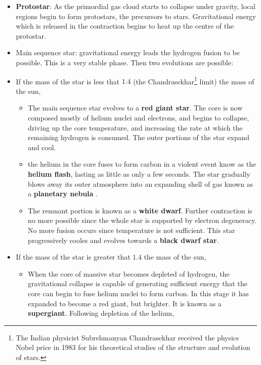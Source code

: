 \documentclass[12pt]{book}
\begin{document}
\begin{itemize}
\item {\bf Protostar}: As the primordial gas cloud starts to collapse under
gravity, local regions begin to form  protostars, the precursors to
stars. Gravitational energy which is 
released in the contraction begins to heat up the centre of the
protostar.
\item Main sequence star: gravitational energy leads the hydrogen
fusion to be possible. This is a very stable phase.
Then two evolutions are possible:
\item If the mass of the star is less that $1.4$ (the
Chandrasekhar\footnote{The Indian physicist Subrehmanyan Chandrasekhar
received the physics Nobel price in 1983 for his theoretical studies of the
structure and evolution of stars.} 
limit) the mass of the
sun, 
\begin{itemize}
\item The main sequence star evolves to a {\bf red giant star}.
The core is now
composed mostly of helium nuclei and electrons, and begins to
collapse, driving up the core temperature, and increasing the rate at
which the remaining hydrogen is consumed. The outer portions of the
star expand and cool.
\item the helium in the core fuses to form carbon
in a violent event know as the {\bf helium flash},
lasting as little as only 
a few seconds.  The star gradually blows away its outer atmosphere
into an expanding shell of gas known as a {\bf planetary nebula}
.
\item The remnant portion is known
as a {\bf white dwarf}. Further contraction is no
more possible since 
the whole star is supported by electron degeneracy. No more fusion
occurs since temperature is not sufficient. This star
progressively cooles and evolves towards a {\bf black dwarf star}.
\end{itemize}
\item If the mass of the star is greater that $1.4$ the mass of the
sun, 
\begin{itemize}
\item When the core of massive star becomes depleted of hydrogen, the
gravitational collapse is capable of generating sufficient energy that
the core can begin to fuse helium nuclei to form carbon. In this stage
it has expanded to become a red giant, but brighter. It is known as a
{\bf supergiant}. Following depletion of the helium,

\end{itemize}
\end{itemize}
\end{document}
